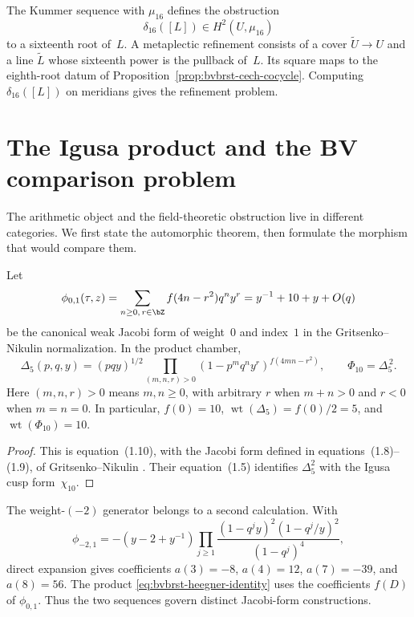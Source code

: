 \begin{remark}
\label{rem:bvbrst-mu16-metaplectic-refinement}
The Kummer sequence with $\mu_{16}$ defines the obstruction
\[
 \delta_{16}([L])\in H^2(U,\mu_{16})
\]
to a sixteenth root of~$L$.  A metaplectic refinement consists of a
cover $\widetilde U\to U$ and a line $\widetilde L$ whose sixteenth
power is the pullback of~$L$.  Its square maps to the eighth-root
datum of Proposition~\ref{prop:bvbrst-cech-cocycle}.  Computing
$\delta_{16}([L])$ on meridians gives the refinement problem.
\end{remark}

\section{The Igusa product and the BV comparison problem}
\label{sec:bvbrst-heegner-all-order}

The arithmetic object and the field-theoretic obstruction live in
different categories.  We first state the automorphic theorem, then
formulate the morphism that would compare them.

\begin{theorem}
\label{thm:bvbrst-heegner-all-order}
Let
\[
 \phi_{0,1}(\tau,z)=\sum_{n\geq0,\,r\in\bZ}f(4n-r^2)q^ny^r
 =y^{-1}+10+y+O(q)
\]
be the canonical weak Jacobi form of weight~$0$ and index~$1$ in the
Gritsenko--Nikulin normalization.  In the product chamber,
\begin{equation}\label{eq:bvbrst-heegner-identity}
 \Delta _5(p,q,y)
 =(pqy)^{1/2}\prod_{(m,n,r)>0}
       (1-p^mq^ny^r)^{f(4mn-r^2)},
 \qquad \Phi_{10}=\Delta _5^{\,2}.
\end{equation}
Here $(m,n,r)>0$ means $m,n\geq0$, with arbitrary $r$ when
$m+n>0$ and $r<0$ when $m=n=0$.
In particular, $f(0)=10$, $\operatorname{wt}(\Delta _5)=f(0)/2=5$,
and $\operatorname{wt}(\Phi_{10})=10$.
\end{theorem}

\begin{proof}
This is equation~(1.10), with the Jacobi form defined in
equations~(1.8)--(1.9), of Gritsenko--Nikulin
\cite[eqs.~(1.8)--(1.10)]{GN96Igusa}.  Their equation~(1.5) identifies
$\Delta _5^2$ with the Igusa cusp form~$\chi_{10}$.
\end{proof}

The weight-$(-2)$ generator belongs to a second calculation.  With
\[
 \phi_{-2,1}=-(y-2+y^{-1})
 \prod_{j\geq1}\frac{(1-q^jy)^2(1-q^j/y)^2}{(1-q^j)^4},
\]
direct expansion gives coefficients
$a(3)=-8$, $a(4)=12$, $a(7)=-39$, and $a(8)=56$.  The product
\eqref{eq:bvbrst-heegner-identity} uses the coefficients $f(D)$ of
$\phi_{0,1}$.  Thus the two sequences govern distinct Jacobi-form
constructions.

